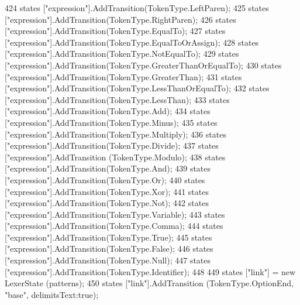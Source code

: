 \begin{DoxyCode}
{424             states [\textcolor{stringliteral}{"expression"}].AddTransition(TokenType.LeftParen);
425             states [\textcolor{stringliteral}{"expression"}].AddTransition(TokenType.RightParen);
426             states [\textcolor{stringliteral}{"expression"}].AddTransition(TokenType.EqualTo);
427             states [\textcolor{stringliteral}{"expression"}].AddTransition(TokenType.EqualToOrAssign);
428             states [\textcolor{stringliteral}{"expression"}].AddTransition(TokenType.NotEqualTo);
429             states [\textcolor{stringliteral}{"expression"}].AddTransition(TokenType.GreaterThanOrEqualTo);
430             states [\textcolor{stringliteral}{"expression"}].AddTransition(TokenType.GreaterThan);
431             states [\textcolor{stringliteral}{"expression"}].AddTransition(TokenType.LessThanOrEqualTo);
432             states [\textcolor{stringliteral}{"expression"}].AddTransition(TokenType.LessThan);
433             states [\textcolor{stringliteral}{"expression"}].AddTransition(TokenType.Add);
434             states [\textcolor{stringliteral}{"expression"}].AddTransition(TokenType.Minus);
435             states [\textcolor{stringliteral}{"expression"}].AddTransition(TokenType.Multiply);
436             states [\textcolor{stringliteral}{"expression"}].AddTransition(TokenType.Divide);
437             states [\textcolor{stringliteral}{"expression"}].AddTransition (TokenType.Modulo);
438             states [\textcolor{stringliteral}{"expression"}].AddTransition(TokenType.And);
439             states [\textcolor{stringliteral}{"expression"}].AddTransition(TokenType.Or);
440             states [\textcolor{stringliteral}{"expression"}].AddTransition(TokenType.Xor);
441             states [\textcolor{stringliteral}{"expression"}].AddTransition(TokenType.Not);
442             states [\textcolor{stringliteral}{"expression"}].AddTransition(TokenType.Variable);
443             states [\textcolor{stringliteral}{"expression"}].AddTransition(TokenType.Comma);
444             states [\textcolor{stringliteral}{"expression"}].AddTransition(TokenType.True);
445             states [\textcolor{stringliteral}{"expression"}].AddTransition(TokenType.False);
446             states [\textcolor{stringliteral}{"expression"}].AddTransition(TokenType.Null);
447             states [\textcolor{stringliteral}{"expression"}].AddTransition(TokenType.Identifier);
448 
449             states [\textcolor{stringliteral}{"link"}] = \textcolor{keyword}{new} LexerState (patterns);
450             states [\textcolor{stringliteral}{"link"}].AddTransition (TokenType.OptionEnd, \textcolor{stringliteral}{"base"}, delimitsText:\textcolor{keyword}{true});
}
\end{DoxyCode}
